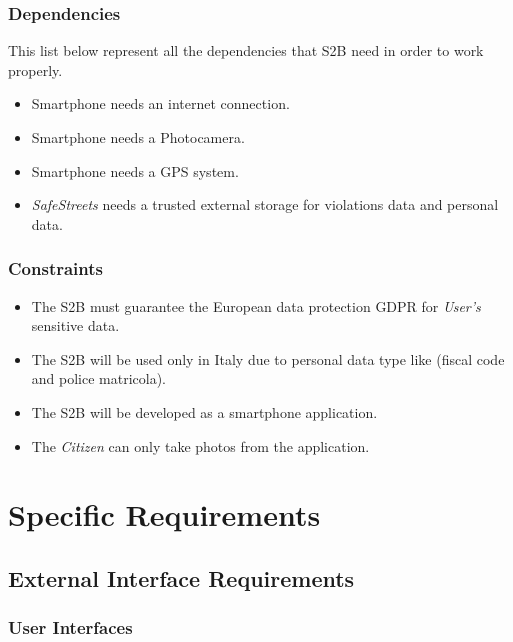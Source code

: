 \documentclass{article}
\begin{document}
\subsubsection{Dependencies}
This list below represent all the dependencies that S2B need in order to work properly.
\begin{itemize}
    \item Smartphone needs an internet connection.
    \item Smartphone needs a Photocamera.
    \item Smartphone needs a GPS system.
    \item \textit{SafeStreets} needs a trusted external storage for violations data and personal data.
\end{itemize}

\subsubsection{Constraints}
\begin{itemize}
    \item The S2B must guarantee the European data protection GDPR for \textit{User's} sensitive data.
    \item The S2B will be used only in Italy due to personal data type like (fiscal code and police matricola).
    \item The S2B will be developed as a smartphone application.
    \item The \textit{Citizen} can only take photos from the application. 
\end{itemize}

\clearpage
\section{Specific Requirements}

\subsection{External Interface Requirements}
\subsubsection{User Interfaces}
\end{document}
